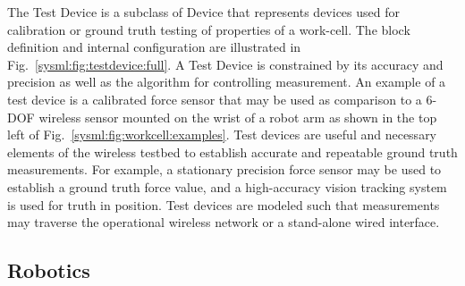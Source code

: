 The Test Device is a subclass of Device that represents devices used for calibration or ground truth testing of properties of a work-cell.  The block definition and internal configuration are illustrated in Fig.~\ref{sysml:fig:testdevice:full}.  A Test Device is constrained by its accuracy and precision as well as the algorithm for controlling measurement.  An example of a test device is a calibrated force sensor that may be used as comparison to a 6-DOF wireless sensor mounted on the wrist of a robot arm as shown in the top left of Fig.~\ref{sysml:fig:workcell:examples}. Test devices are useful and necessary elements of the wireless testbed to establish accurate and repeatable ground truth measurements.  For example, a stationary precision force sensor may be used to establish a ground truth force value, and a high-accuracy vision tracking system is used for truth in position.  Test devices are modeled such that measurements may traverse the operational wireless network or a stand-alone wired interface.

\subsection{Robotics}\label{sysml:sec:robotics}


